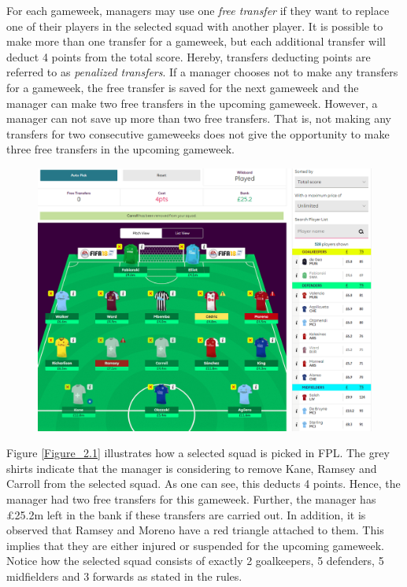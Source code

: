 \newpar

For each gameweek, managers may use one \textit{free transfer} if they want to replace one of their players in the selected squad  with another player. It is possible to make more than one transfer for a gameweek, but each additional transfer will deduct 4 points from the total score. Hereby, transfers deducting points are referred to as \textit{penalized transfers}. If a manager chooses not to make any transfers for a gameweek, the free transfer is saved for the next gameweek and the manager can make two free transfers in the upcoming gameweek. However, a manager can not save up more than two free transfers. That is, not making any transfers for two consecutive gameweeks does not give the opportunity to make three free transfers in the upcoming gameweek.


\begin{figure}[H]
\centering
\includegraphics[scale=0.35]{fig/fantasyteam1.png}
\label{Figure_2.1}
\label{fig:fantasy_bilde}
\end{figure}

Figure \ref{Figure_2.1} illustrates how a selected squad is picked in FPL. The grey shirts indicate that the manager is considering to remove Kane, Ramsey and Carroll from the selected squad. As one can see, this deducts 4 points. Hence, the manager had two free transfers for this gameweek. Further, the manager has \pounds 25.2m left in the bank if these transfers are carried out. In addition, it is observed that Ramsey and Moreno have a red triangle attached to them. This implies that they are either injured or suspended for the upcoming gameweek. Notice how the selected squad consists of exactly 2 goalkeepers, 5 defenders, 5 midfielders and 3 forwards as stated in the rules. 


